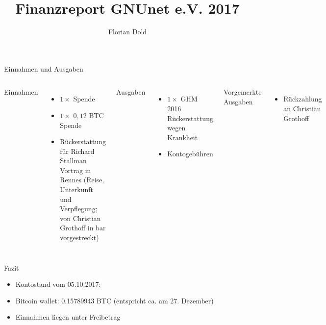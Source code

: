 \documentclass[10pt]{beamer}
\title{Finanzreport GNUnet e.V. 2017}
\date{}
\author{Florian Dold}
\begin{document}
\maketitle

\begin{frame}{Einnahmen und Ausgaben}
  \begin{columns}[T,onlytextwidth]
      Einnahmen
      \begin{itemize}
        \item $1\times$  Spende
        \item $1\times$ $0,12$ BTC Spende
        \item {} R\"uckerstattung f\"ur Richard Stallman Vortrag in Rennes (Reise, Unterkunft und Verpflegung; von Christian Grothoff in bar vorgestreckt)
      \end{itemize}

      Ausgaben
      \begin{itemize}
        \item $1\times$  GHM 2016 R\"uckerstattung wegen Krankheit
        \item Kontogeb\"uhren 
      \end{itemize}
      Vorgemerkte Ausgaben
      \begin{itemize}
        \item {} R\"uckzahlung an Christian Grothoff
      \end{itemize}
  \end{columns}
\end{frame}

\begin{frame}{Fazit}
  \begin{itemize}
    \item Kontostand vom 05.10.2017: 
    \item Bitcoin wallet: 0.15789943 BTC (entspricht ca.  am 27. Dezember)
    \item Einnahmen liegen unter Freibetrag
  \end{itemize}
\end{frame}
\end{document}
